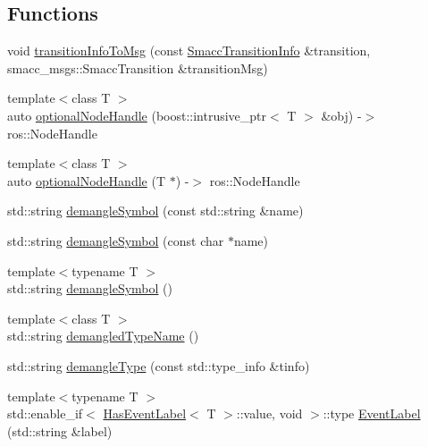 \subsection*{Functions}
\begin{DoxyCompactItemize}
\item 
void \hyperlink{namespacesmacc_1_1introspection_a6c1b51c4d44fd5e41fe218f1ee150681}{transition\+Info\+To\+Msg} (const \hyperlink{structsmacc_1_1introspection_1_1SmaccTransitionInfo}{Smacc\+Transition\+Info} \&transition, smacc\+\_\+msgs\+::\+Smacc\+Transition \&transition\+Msg)
\item 
{\footnotesize template$<$class T $>$ }\\auto \hyperlink{namespacesmacc_1_1introspection_a8acc3b4146a8b2bb0a9fa4178840e9b9}{optional\+Node\+Handle} (boost\+::intrusive\+\_\+ptr$<$ T $>$ \&obj) -\/$>$ ros\+::\+Node\+Handle
\item 
{\footnotesize template$<$class T $>$ }\\auto \hyperlink{namespacesmacc_1_1introspection_a96b953e65af67591266e9ae4b3e4ee49}{optional\+Node\+Handle} (T $\ast$) -\/$>$ ros\+::\+Node\+Handle
\item 
std\+::string \hyperlink{namespacesmacc_1_1introspection_a2f495108db3e57604d8d3ff5ef030302}{demangle\+Symbol} (const std\+::string \&name)
\item 
std\+::string \hyperlink{namespacesmacc_1_1introspection_af32c671351d958213f8031bb90767922}{demangle\+Symbol} (const char $\ast$name)
\item 
{\footnotesize template$<$typename T $>$ }\\std\+::string \hyperlink{namespacesmacc_1_1introspection_aa9158a0ff0cfe83a59877e6af7d7f873}{demangle\+Symbol} ()
\item 
{\footnotesize template$<$class T $>$ }\\std\+::string \hyperlink{namespacesmacc_1_1introspection_af1b3277706c3299b589c3fa801169286}{demangled\+Type\+Name} ()
\item 
std\+::string \hyperlink{namespacesmacc_1_1introspection_a81ad2fc77a0262640d4b1bd273938603}{demangle\+Type} (const std\+::type\+\_\+info \&tinfo)
\item 
{\footnotesize template$<$typename T $>$ }\\std\+::enable\+\_\+if$<$ \hyperlink{classsmacc_1_1introspection_1_1HasEventLabel}{Has\+Event\+Label}$<$ T $>$\+::value, void $>$\+::type \hyperlink{namespacesmacc_1_1introspection_a7d5ea10a24373bf452d3b6987d0a6bd0}{Event\+Label} (std\+::string \&label)
\item 

\end{DoxyCompactItemize}
